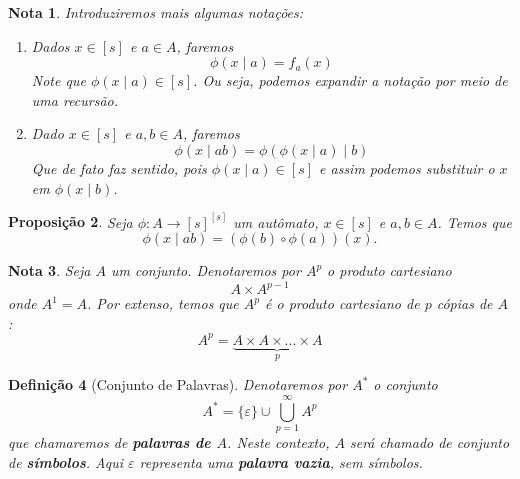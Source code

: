 \documentclass[11pt]{article}
\theoremstyle{plain}
\newtheorem{definicao}{Definição}[section]
\newtheorem{nota}[definicao]{Nota}
\newtheorem{proplivre}[definicao]{Proposição}
\theoremstyle{nonumberplain}
\newcommand{\set}[1]{\{#1\}}
\newcommand{\ainf}{A^*}
\newcommand{\funcset}[1]{#1^{#1}}
\newcommand{\automataAs}[1]{#1 : A \to \funcset{[s]}}
\begin{document}
\begin{nota} \label{nota:notacao_estado_inicial}
    Introduziremos mais algumas notações: \begin{enumerate}
        \item Dados $x \in [s]$ e $a \in A$, faremos \begin{equation}
            \phi(x \mid a) = f_a(x)
        \end{equation}
        Note que $\phi(x \mid a) \in [s]$. Ou seja, podemos expandir a notação por meio de uma recursão.
        \item Dado $x \in [s]$ e $a, b \in A$, faremos \begin{equation}
            \phi(x \mid ab) = \phi(\phi(x \mid a) \mid b)
        \end{equation}
        Que de fato faz sentido, pois $\phi(x \mid a) \in [s]$ e assim podemos substituir o $x$ em $\phi(x \mid b)$.
    \end{enumerate}
\end{nota}

\begin{proplivre} \label{prop:composicao_automato}
    Seja $\automataAs{\phi}$ um autômato, $x \in [s]$ e $a, b \in A$. Temos que \begin{equation}
        \phi(x \mid ab) = (\phi(b) \circ \phi(a))(x).
    \end{equation}
\end{proplivre}

\begin{nota}
    Seja $A$ um conjunto. Denotaremos por $A^p$ o produto cartesiano \begin{equation}
        A \times A^{p-1}
    \end{equation}
    onde $A^1 = A$. Por extenso, temos que $A^p$ é o produto cartesiano de $p$ cópias de $A$: \begin{equation}
        A^p = \underbrace{A \times A \times ... \times A}_{p}
    \end{equation}
\end{nota}

\begin{definicao}[Conjunto de Palavras]
    Denotaremos por $\ainf$ o conjunto \begin{equation}
        \ainf = \set \varepsilon \cup \bigcup_{p = 1}^{\infty} A^p
    \end{equation}
    que chamaremos de \textbf{palavras de $A$}. Neste contexto, $A$ será chamado de conjunto de \textbf{símbolos}. Aqui $\varepsilon$ representa uma \textbf{palavra vazia}, sem símbolos.
\end{definicao}
\end{document}
